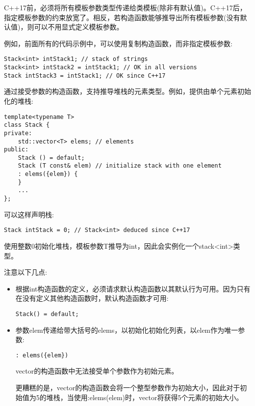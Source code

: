 C++17前，必须将所有模板参数类型传递给类模板(除非有默认值)。C++17后，指定模板参数的约束放宽了。相反，若构造函数能够推导出所有模板参数(没有默认值)，则可以不用显式定义模板参数。

例如，前面所有的代码示例中，可以使用复制构造函数，而非指定模板参数:

\begin{lstlisting}[style=styleCXX]
Stack<int> intStack1; // stack of strings
Stack<int> intStack2 = intStack1; // OK in all versions
Stack intStack3 = intStack1; // OK since C++17
\end{lstlisting}

通过接受参数的构造函数，支持推导堆栈的元素类型。例如，提供由单个元素初始化的堆栈:

\begin{lstlisting}[style=styleCXX]
template<typename T>
class Stack {
private:
	std::vector<T> elems; // elements
public:
	Stack () = default;
	Stack (T const& elem) // initialize stack with one element
	: elems({elem}) {
	}
	...
};
\end{lstlisting}

可以这样声明栈:

\begin{lstlisting}[style=styleCXX]
Stack intStack = 0; // Stack<int> deduced since C++17
\end{lstlisting}

使用整数0初始化堆栈，模板参数T推导为int，因此会实例化一个stack<int>类型。

注意以下几点:

\begin{itemize}
\item 
根据int构造函数的定义，必须请求默认构造函数以其默认行为可用。因为只有在没有定义其他构造函数时，默认构造函数才可用:
\begin{lstlisting}[style=styleCXX]
Stack() = default;
\end{lstlisting}

\item 
参数elem传递给带大括号的elems，以初始化初始化列表，以elem作为唯一参数:
\begin{lstlisting}[style=styleCXX]
: elems({elem})
\end{lstlisting}
vector的构造函数中无法接受单个参数作为初始元素。

\begin{tcolorbox}[colback=webgreen!5!white,colframe=webgreen!75!black]
\hspace*{0.75cm}更糟糕的是，vector的构造函数会将一个整型参数作为初始大小，因此对于初始值为5的堆栈，当使用:elems(elem)时，vector将获得5个元素的初始大小。
\end{tcolorbox}

\end{itemize}

